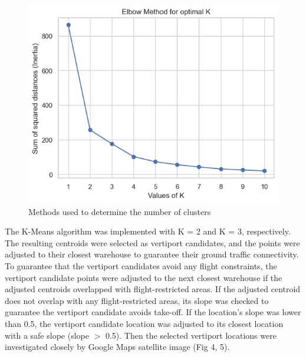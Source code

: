 \documentclass[11pt]{article}
\begin{document}
\begin{figure}[H]
\begin{minipage}{0.32\textwidth}
      \end{minipage}%
      \begin{minipage}{0.32\textwidth}
        \centering
        \includegraphics[width=\linewidth]{./figure/elbow.png}
      \end{minipage}
      \caption{Methods used to determine the number of clusters }
      \label{fig:overall}
    \end{figure}
    
    The K-Means algorithm was implemented with K = 2 and K = 3, respectively. The resulting centroids were selected as vertiport candidates, and the points were adjusted to their closest warehouse to guarantee their ground traffic connectivity. To guarantee that the vertiport candidates avoid any flight constraints, the vertiport candidate points were adjusted to the next closest warehouse if the adjusted centroids overlapped with flight-restricted areas. If the adjusted centroid does not overlap with any flight-restricted areas, its slope was checked to guarantee the vertiport candidate avoids take-off. If the location’s slope was lower than 0.5, the vertiport candidate location was adjusted to its closest location with a safe slope (slope ${>}$ 0.5). Then the selected vertiport locations were investigated closely by Google Maps satellite image (Fig 4, 5).\\
\end{document}
